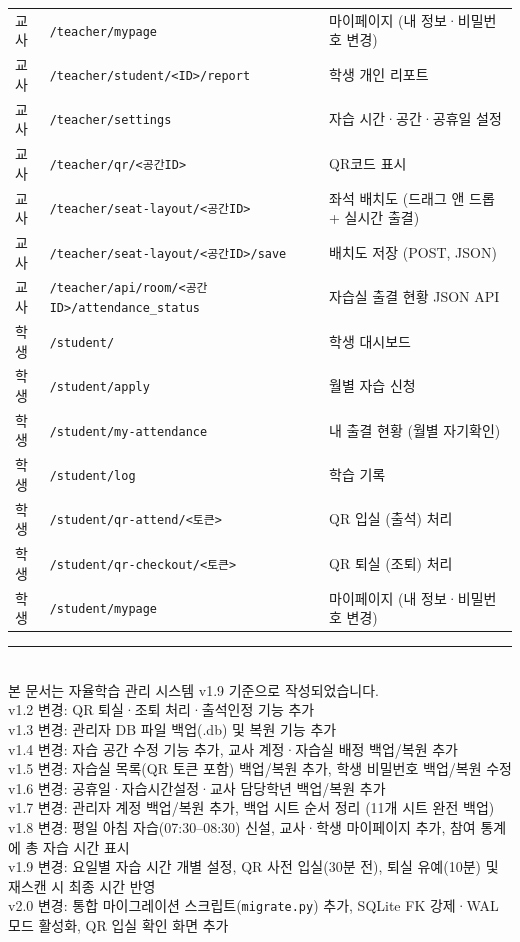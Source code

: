 \documentclass[a4paper,12pt]{article}
\begin{document}
\begin{center}
\begin{tabularx}{\textwidth}{ll>{\raggedright\arraybackslash}X}
교사 & \texttt{/teacher/mypage} & 마이페이지 (내 정보·비밀번호 변경) \\
교사 & \texttt{/teacher/student/<ID>/report} & 학생 개인 리포트 \\
교사 & \texttt{/teacher/settings} & 자습 시간·공간·공휴일 설정 \\
교사 & \texttt{/teacher/qr/<공간ID>} & QR코드 표시 \\
교사 & \texttt{/teacher/seat-layout/<공간ID>} & 좌석 배치도 (드래그 앤 드롭 + 실시간 출결) \\
교사 & \texttt{/teacher/seat-layout/<공간ID>/save} & 배치도 저장 (POST, JSON) \\
교사 & \texttt{/teacher/api/room/<공간ID>/attendance\_status} & 자습실 출결 현황 JSON API \\
\midrule
학생 & \texttt{/student/} & 학생 대시보드 \\
학생 & \texttt{/student/apply} & 월별 자습 신청 \\
학생 & \texttt{/student/my-attendance} & 내 출결 현황 (월별 자기확인) \\
학생 & \texttt{/student/log} & 학습 기록 \\
학생 & \texttt{/student/qr-attend/<토큰>} & QR 입실 (출석) 처리 \\
학생 & \texttt{/student/qr-checkout/<토큰>} & QR 퇴실 (조퇴) 처리 \\
학생 & \texttt{/student/mypage} & 마이페이지 (내 정보·비밀번호 변경) \\
\bottomrule
\end{tabularx}
\end{center}

\vfill
\begin{center}
\rule{0.6\textwidth}{0.4pt}\\[0.5em]
{\small 본 문서는 자율학습 관리 시스템 v1.9 기준으로 작성되었습니다.}\\[0.2em]
{\small v1.2 변경: QR 퇴실·조퇴 처리·출석인정 기능 추가}\\[0.1em]
{\small v1.3 변경: 관리자 DB 파일 백업(.db) 및 복원 기능 추가}\\[0.1em]
{\small v1.4 변경: 자습 공간 수정 기능 추가, 교사 계정·자습실 배정 백업/복원 추가}\\[0.1em]
{\small v1.5 변경: 자습실 목록(QR 토큰 포함) 백업/복원 추가, 학생 비밀번호 백업/복원 수정}\\[0.1em]
{\small v1.6 변경: 공휴일·자습시간설정·교사 담당학년 백업/복원 추가}\\[0.1em]
{\small v1.7 변경: 관리자 계정 백업/복원 추가, 백업 시트 순서 정리 (11개 시트 완전 백업)}\\[0.1em]
{\small v1.8 변경: 평일 아침 자습(07:30--08:30) 신설, 교사·학생 마이페이지 추가, 참여 통계에 총 자습 시간 표시}\\[0.1em]
{\small v1.9 변경: 요일별 자습 시간 개별 설정, QR 사전 입실(30분 전), 퇴실 유예(10분) 및 재스캔 시 최종 시간 반영}\\[0.1em]
{\small v2.0 변경: 통합 마이그레이션 스크립트(\texttt{migrate.py}) 추가, SQLite FK 강제·WAL 모드 활성화, QR 입실 확인 화면 추가}
\end{center}
\end{document}
